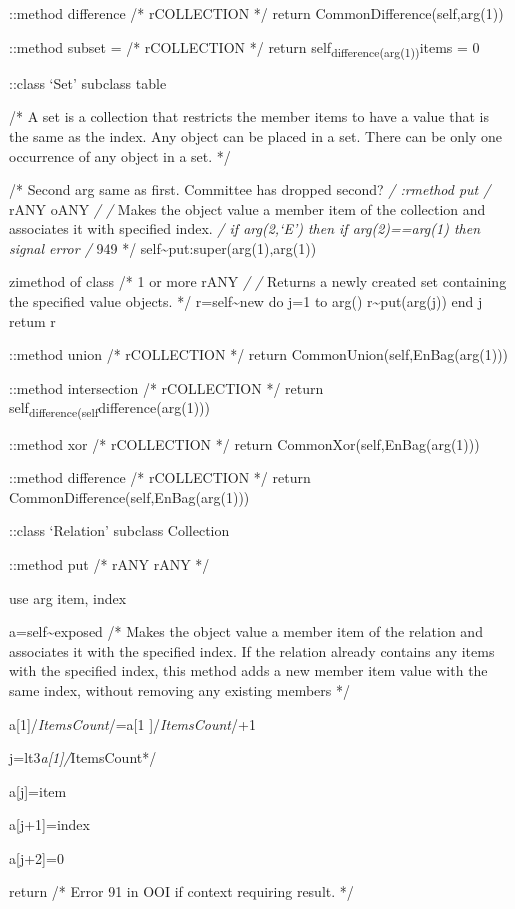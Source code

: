 ::method difference /* rCOLLECTION */ return
CommonDifference(self,arg(1))

::method subset = /* rCOLLECTION */ return
self\textsubscript{difference(arg(1))}items = 0

::class `Set' subclass table

/* A set is a collection that restricts the member items to have a value
that is the same as the index. Any object can be placed in a set. There
can be only one occurrence of any object in a set. */

/* Second arg same as first. Committee has dropped second? \emph{/
:rmethod put /} rANY oANY \emph{/ /} Makes the object value a member
item of the collection and associates it with specified index. \emph{/
if arg(2,`E') then if arg(2)==arg(1) then signal error /} 949 */
self\textasciitilde put:super(arg(1),arg(1))

zimethod of class /* 1 or more rANY \emph{/ /} Returns a newly created
set containing the specified value objects. */ r=self\textasciitilde new
do j=1 to arg() r\textasciitilde put(arg(j)) end j retum r

::method union /* rCOLLECTION */ return CommonUnion(self,EnBag(arg(1)))

::method intersection /* rCOLLECTION */ return
self\textsubscript{difference(self}difference(arg(1)))

::method xor /* rCOLLECTION */ return CommonXor(self,EnBag(arg(1)))

::method difference /* rCOLLECTION */ return
CommonDifference(self,EnBag(arg(1)))

::class `Relation' subclass Collection

::method put /* rANY rANY */

use arg item, index

a=self\textasciitilde exposed /* Makes the object value a member item of
the relation and associates it with the specified index. If the relation
already contains any items with the specified index, this method adds a
new member item value with the same index, without removing any existing
members */

a{[}1{]}/\emph{ItemsCount}/=a{[}1 {]}/\emph{ItemsCount}/+1

j=lt3\emph{a{[}1{]}/}ItemsCount*/

a{[}j{]}=item

a{[}j+1{]}=index

a{[}j+2{]}=0

return /* Error 91 in OOI if context requiring result. */


